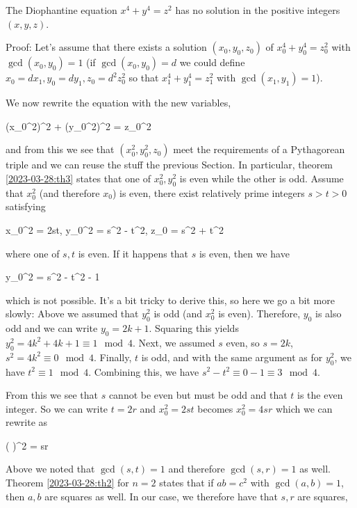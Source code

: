 \begin{theorem}
    The Diophantine equation $x^4 + y^4 = z^2$ has no solution in the positive integers $(x,y,z)$.
\end{theorem}

Proof: Let's assume that there exists a solution $(x_0, y_0, z_0)$ of $x_0^4 + y_0^4 = z_0^2$ with $\gcd(x_0, y_0) = 1$ (if $\gcd(x_0, y_0) = d$ we could define $x_0 = d x_1, y_0 = d y_1, z_0 = d^2 z_0^2$ so that $x_1^4 + y_1^4 = z_1^2$ with $\gcd(x_1, y_1) = 1$).

We now rewrite the equation with the new variables,

\bee
(x_0^2)^2 + (y_0^2)^2 = z_0^2
\eee

and from this we see that $(x_0^2, y_0^2, z_0)$ meet the requirements of a Pythagorean triple and we can reuse the stuff the previous Section. In particular, theorem \ref{2023-03-28:th3} states that one of $x_0^2, y_0^2$ is even while the other is odd. Assume that $x_0^2$ (and therefore $x_0$) is even, there exist relatively prime integers $s > t > 0$ satisfying

\bee
x_0^2 = 2st, \quad y_0^2 = s^2 - t^2, \quad z_0 = s^2 + t^2
\eee

where one of $s, t$ is even. If it happens that $s$ is even, then we have

 \equiv y_0^2 = s^2 - t^2  - 1  
\eee

which is not possible. It's a bit tricky to derive this, so here we go a bit more slowly: Above we assumed that $y_0^2$ is odd (and $x_0^2$ is even). Therefore, $y_0$ is also odd and we can write $y_0 = 2k+1$. Squaring this yields $y_0^2 = 4k^2 + 4k + 1 \equiv 1 \mod 4$. Next, we assumed $s$ even, so $s = 2k$, $s^2 = 4k^2 \equiv 0 \mod 4$. Finally, $t$ is odd, and with the same argument as for $y_0^2$, we have $t^2 \equiv 1 \mod 4$. Combining this, we have $s^2 - t^2 \equiv 0 - 1 \equiv 3 \mod 4$.

From this we see that $s$ cannot be even but must be odd and that $t$ is the even integer. So we can write $t = 2r$ and $x_0^2 = 2st$ becomes $x_0^2 = 4sr$ which we can rewrite as

\bee
\left(  \right)^2 = sr
\eee

Above we noted that $\gcd(s, t) = 1$ and therefore $\gcd(s, r) = 1$ as well. Theorem \ref{2023-03-28:th2} for $n=2$ states that if $ab=c^2$ with $\gcd(a,b)=1$, then $a, b$ are squares as well. In our case, we therefore have that $s, r$ are squares,

